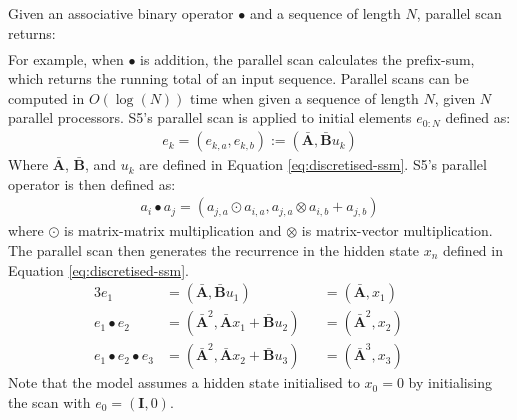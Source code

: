 \documentclass{article}
\newcommand{\oldop}{\bullet}
\begin{document}
Given an associative binary operator $\oldop$ and a sequence of length $N$, parallel scan returns:
\begin{align}
[ e_1, e_1 \oldop e_2, \cdots, e_1 \oldop e_2 \oldop \cdots \oldop e_N ]
\end{align}
For example, when $\oldop$ is addition, the parallel scan calculates the prefix-sum, which returns the running total of an input sequence. Parallel scans can be computed in $O(\log(N))$ time when given a sequence of length $N$, given $N$ parallel processors.
S5's parallel scan is applied to initial elements $e_{0:N}$ defined as:
\begin{align}
e_k = (e_{k,a}, e_{k,b}) := (\mathbf{\bar{A}}, \mathbf{\bar{B}}u_k)
\end{align}
Where $\mathbf{\bar{A}}$, $\mathbf{\bar{B}}$, and $u_k$ are defined in Equation \ref{eq:discretised-ssm}. S5's parallel operator is then defined as:
\begin{align}
\label{eq:s5-op}
a_i \oldop a_j = (a_{j,a} \odot a_{i,a}, a_{j,a} \otimes a_{i,b} + a_{j,b})
\end{align}
where $\odot$ is matrix-matrix multiplication and $\otimes$ is matrix-vector multiplication. The parallel scan then generates the recurrence in the hidden state $x_n$ defined in Equation \ref{eq:discretised-ssm}.
\begin{alignat}{3}
e_1 &= (\mathbf{\bar{A}}, \mathbf{\bar{B}}u_1) &&= (\mathbf{\bar{A}}, x_1)&&\\
e_1 \oldop e_2 &= (\mathbf{\bar{A}}^2, \mathbf{\bar{A}} x_1 + \mathbf{\bar{B}}u_2) &&= (\mathbf{\bar{A}}^2, x_2)&&\\
e_1 \oldop e_2 \oldop e_3 &= (\mathbf{\bar{A}}^2, \mathbf{\bar{A}} x_2 + \mathbf{\bar{B}}u_3) &&= (\mathbf{\bar{A}}^3, x_3)&&
\end{alignat}
Note that the model assumes a hidden state initialised to $x_0=0$ by initialising the scan with $e_0=(\mathbf{I}, 0)$.
\end{document}
